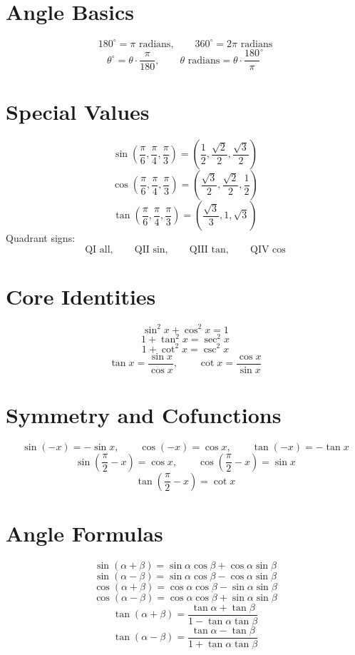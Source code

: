\documentclass[11pt]{article}
\begin{document}

\section*{Angle Basics}
\[
180^\circ=\pi\text{ radians},\qquad 360^\circ=2\pi\text{ radians}
\]
\[
\theta^\circ=\theta\cdot\frac{\pi}{180},\qquad
\theta\text{ radians}=\theta\cdot\frac{180}{\pi}^\circ
\]

\section*{Special Values}
\[
\sin\left(\frac{\pi}{6},\frac{\pi}{4},\frac{\pi}{3}\right)=
\left(\frac12,\frac{\sqrt2}{2},\frac{\sqrt3}{2}\right)
\]
\[
\cos\left(\frac{\pi}{6},\frac{\pi}{4},\frac{\pi}{3}\right)=
\left(\frac{\sqrt3}{2},\frac{\sqrt2}{2},\frac12\right)
\]
\[
\tan\left(\frac{\pi}{6},\frac{\pi}{4},\frac{\pi}{3}\right)=
\left(\frac{\sqrt3}{3},1,\sqrt3\right)
\]
Quadrant signs:
\[
\text{QI all},\qquad \text{QII sin},\qquad \text{QIII tan},\qquad \text{QIV cos}
\]

\section*{Core Identities}
\[
\sin^2x+\cos^2x=1
\]
\[
1+\tan^2x=\sec^2x
\]
\[
1+\cot^2x=\csc^2x
\]
\[
\tan x=\frac{\sin x}{\cos x},\qquad
\cot x=\frac{\cos x}{\sin x}
\]

\section*{Symmetry and Cofunctions}
\[
\sin(-x)=-\sin x,\qquad \cos(-x)=\cos x,\qquad \tan(-x)=-\tan x
\]
\[
\sin\left(\frac{\pi}{2}-x\right)=\cos x,\qquad
\cos\left(\frac{\pi}{2}-x\right)=\sin x
\]
\[
\tan\left(\frac{\pi}{2}-x\right)=\cot x
\]

\section*{Angle Formulas}
\[
\sin(\alpha+\beta)=\sin\alpha\cos\beta+\cos\alpha\sin\beta
\]
\[
\sin(\alpha-\beta)=\sin\alpha\cos\beta-\cos\alpha\sin\beta
\]
\[
\cos(\alpha+\beta)=\cos\alpha\cos\beta-\sin\alpha\sin\beta
\]
\[
\cos(\alpha-\beta)=\cos\alpha\cos\beta+\sin\alpha\sin\beta
\]
\[
\tan(\alpha+\beta)=\frac{\tan\alpha+\tan\beta}{1-\tan\alpha\tan\beta}
\]
\[
\tan(\alpha-\beta)=\frac{\tan\alpha-\tan\beta}{1+\tan\alpha\tan\beta}
\]
\end{document}
